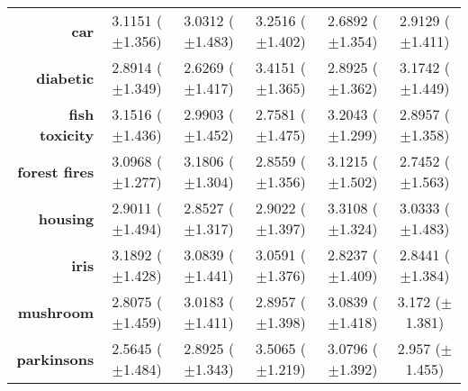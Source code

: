 \begin{table}[htb]
{\begin{tabular}{r|ccccc}
			\textbf{car}                 & \cellcolor[rgb]{ .992,  .729,  .482}3.1151 ($\pm$1.356) & \cellcolor[rgb]{ 1,  .922,  .518}3.0312 ($\pm$1.483)    & \cellcolor[rgb]{ .973,  .412,  .42}3.2516 ($\pm$1.402)  & \cellcolor[rgb]{ .388,  .745,  .482}2.6892 ($\pm$1.354) & \cellcolor[rgb]{ .788,  .859,  .502}2.9129 ($\pm$1.411) \\
			\textbf{diabetic}            & \cellcolor[rgb]{ .996,  .918,  .514}2.8914 ($\pm$1.349) & \cellcolor[rgb]{ .388,  .745,  .482}2.6269 ($\pm$1.417) & \cellcolor[rgb]{ .973,  .412,  .42}3.4151 ($\pm$1.365)  & \cellcolor[rgb]{ 1,  .922,  .518}2.8925 ($\pm$1.362)    & \cellcolor[rgb]{ .988,  .647,  .467}3.1742 ($\pm$1.449) \\
			\textbf{fish toxicity}       & \cellcolor[rgb]{ .98,  .541,  .447}3.1516 ($\pm$1.436)  & \cellcolor[rgb]{ 1,  .922,  .518}2.9903 ($\pm$1.452)    & \cellcolor[rgb]{ .388,  .745,  .482}2.7581 ($\pm$1.475) & \cellcolor[rgb]{ .973,  .412,  .42}3.2043 ($\pm$1.299)  & \cellcolor[rgb]{ .749,  .847,  .502}2.8957 ($\pm$1.358) \\
			\textbf{forest fires}        & \cellcolor[rgb]{ 1,  .922,  .518}3.0968 ($\pm$1.277)    & \cellcolor[rgb]{ .973,  .412,  .42}3.1806 ($\pm$1.304)  & \cellcolor[rgb]{ .58,  .8,  .49}2.8559 ($\pm$1.356)     & \cellcolor[rgb]{ .992,  .773,  .49}3.1215 ($\pm$1.502)  & \cellcolor[rgb]{ .388,  .745,  .482}2.7452 ($\pm$1.563) \\
			\textbf{housing}             & \cellcolor[rgb]{ .984,  .918,  .514}2.9011 ($\pm$1.494) & \cellcolor[rgb]{ .388,  .745,  .482}2.8527 ($\pm$1.317) & \cellcolor[rgb]{ 1,  .922,  .518}2.9022 ($\pm$1.397)    & \cellcolor[rgb]{ .973,  .412,  .42}3.3108 ($\pm$1.324)  & \cellcolor[rgb]{ .992,  .761,  .486}3.0333 ($\pm$1.483) \\
			\textbf{iris}                & \cellcolor[rgb]{ .973,  .412,  .42}3.1892 ($\pm$1.428)  & \cellcolor[rgb]{ .996,  .827,  .502}3.0839 ($\pm$1.441) & \cellcolor[rgb]{ 1,  .922,  .518}3.0591 ($\pm$1.376)    & \cellcolor[rgb]{ .388,  .745,  .482}2.8237 ($\pm$1.409) & \cellcolor[rgb]{ .439,  .757,  .482}2.8441 ($\pm$1.384) \\
			\textbf{mushroom}            & \cellcolor[rgb]{ .388,  .745,  .482}2.8075 ($\pm$1.459) & \cellcolor[rgb]{ 1,  .922,  .518}3.0183 ($\pm$1.411)    & \cellcolor[rgb]{ .643,  .816,  .494}2.8957 ($\pm$1.398) & \cellcolor[rgb]{ .992,  .706,  .478}3.0839 ($\pm$1.418) & \cellcolor[rgb]{ .973,  .412,  .42}3.172 ($\pm$1.381)   \\
			\textbf{parkinsons}          & \cellcolor[rgb]{ .388,  .745,  .482}2.5645 ($\pm$1.484) & \cellcolor[rgb]{ .898,  .89,  .51}2.8925 ($\pm$1.343)   & \cellcolor[rgb]{ .973,  .412,  .42}3.5065 ($\pm$1.219)  & \cellcolor[rgb]{ .996,  .808,  .498}3.0796 ($\pm$1.392) & \cellcolor[rgb]{ 1,  .922,  .518}2.957 ($\pm$1.455)     \\

\end{tabular}}
\end{table}
